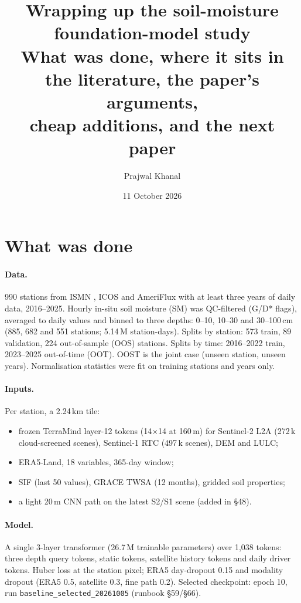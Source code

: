 \documentclass[11pt,a4paper]{article}
\title{\textbf{Wrapping up the soil-moisture foundation-model study}\\[3pt]
\large What was done, where it sits in the literature, the paper's arguments,\\
cheap additions, and the next paper}
\author{Prajwal Khanal}
\date{11 October 2026}
\begin{document}
\maketitle

\section{What was done}

\paragraph{Data.} 990 stations from ISMN \citep{dorigo2021ismn}, ICOS and AmeriFlux with at
least three years of daily data, 2016--2025. Hourly in-situ soil moisture (SM) was QC-filtered
(G/D* flags), averaged to daily values and binned to three depths: 0--10, 10--30 and 30--100\,cm
(885, 682 and 551 stations; 5.14\,M station-days). Splits by station: 573 train, 89 validation,
224 out-of-sample (OOS) stations. Splits by time: 2016--2022 train, 2023--2025 out-of-time
(OOT). OOST is the joint case (unseen station, unseen years). Normalisation statistics were fit
on training stations and years only.

\paragraph{Inputs.} Per station, a 2.24\,km tile:
\begin{itemize}
\item frozen TerraMind \citep{jakubik2025terramind} layer-12 tokens (14$\times$14 at 160\,m) for
  Sentinel-2 L2A (272\,k cloud-screened scenes), Sentinel-1 RTC (497\,k scenes), DEM and LULC;
\item ERA5-Land, 18 variables, 365-day window;
\item SIF (last 50 values), GRACE TWSA (12 months), gridded soil properties;
\item a light 20\,m CNN path on the latest S2/S1 scene (added in \S48).
\end{itemize}

\paragraph{Model.} A single 3-layer transformer (26.7\,M trainable parameters) over 1{,}038
tokens: three depth query tokens, static tokens, satellite history tokens and daily driver tokens.
Huber loss at the station pixel; ERA5 day-dropout 0.15 and modality dropout (ERA5 0.5,
satellite 0.3, fine path 0.2). Selected checkpoint: epoch 10, run
\texttt{baseline\_selected\_20261005} (runbook \S59/\S66).
\end{document}
